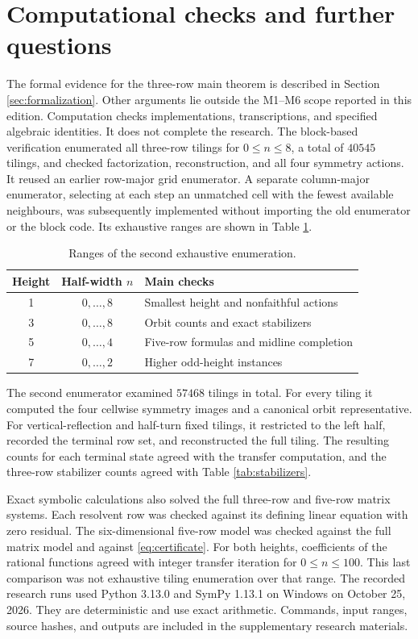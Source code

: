 \section{Computational checks and further questions}\label{sec:computation}

The formal evidence for the three-row main theorem is described in
Section \ref{sec:formalization}. Other arguments lie outside the
M1--M6 scope reported in this edition.
Computation checks implementations, transcriptions, and specified
algebraic identities. It does not complete the research.
The block-based verification enumerated all three-row tilings
for $0\le n\le8$, a total of $40545$ tilings, and checked
factorization, reconstruction, and all four symmetry actions.
It reused an earlier row-major grid enumerator.
A separate column-major enumerator, selecting at each step
an unmatched cell with the fewest available neighbours,
was subsequently implemented without importing the old
enumerator or the block code.
Its exhaustive ranges are shown in Table \ref{tab:checks}.

\begin{table}[htbp]
\centering
\caption{Ranges of the second exhaustive enumeration.}
\label{tab:checks}
\begin{tabular}{ccl}
\toprule
Height & Half-width $n$ & Main checks\\
\midrule
1 & $0,\ldots,8$ & Smallest height and nonfaithful actions\\
3 & $0,\ldots,8$ & Orbit counts and exact stabilizers\\
5 & $0,\ldots,4$ & Five-row formulas and midline completion\\
7 & $0,\ldots,2$ & Higher odd-height instances\\
\bottomrule
\end{tabular}
\end{table}

The second enumerator examined $57468$ tilings in total.
For every tiling it computed the four cellwise symmetry
images and a canonical orbit representative.
For vertical-reflection and half-turn fixed tilings, it
restricted to the left half, recorded the terminal row set,
and reconstructed the full tiling.
The resulting counts for each terminal state agreed with
the transfer computation, and the three-row stabilizer
counts agreed with Table \ref{tab:stabilizers}.

Exact symbolic calculations also solved the full three-row
and five-row matrix systems. Each resolvent row was checked
against its defining linear equation with zero residual.
The six-dimensional five-row model was checked against
the full matrix model and against \eqref{eq:certificate}.
For both heights, coefficients of the rational functions
agreed with integer transfer iteration for $0\le n\le100$.
This last comparison was not exhaustive tiling enumeration
over that range.
The recorded research runs used Python 3.13.0 and SymPy
1.13.1 on Windows on October 25, 2026.
They are deterministic and use exact arithmetic.
Commands, input ranges, source hashes, and outputs are
included in the supplementary research materials.

